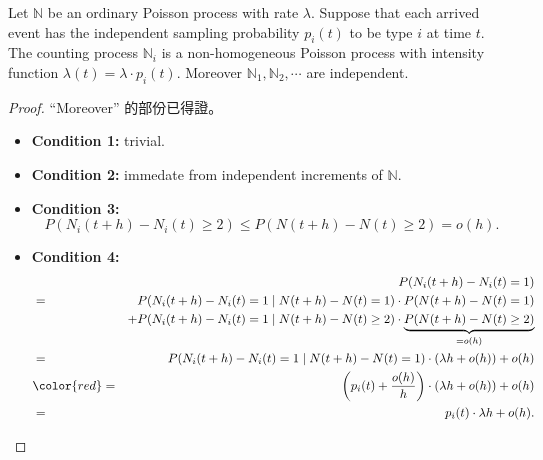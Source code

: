 \begin{proposition} \label{pro:home_to_non-home}
Let $ \mathbb{N} $ be an ordinary Poisson process with rate $ \lambda $. Suppose that each arrived event has the independent sampling probability $ p_{i}(t) $ to be type $ i $ at time $ t $. The counting process $ \mathbb{N}_{i} $ is a non-homogeneous Poisson process with intensity function $ \lambda(t) = \lambda \cdot p_{i}(t) $. Moreover $ \mathbb{N}_{1}, \mathbb{N}_{2}, \cdots $ are independent.
\begin{proof}
``Moreover'' 的部份已得證。
\begin{itemize}
\item \textbf{Condition 1:} trivial.
\item \textbf{Condition 2:} immedate from independent increments of $ \mathbb{N} $.

\item \textbf{Condition 3:}
\[ P(N_{i}(t + h) - N_{i}(t) \ge 2) \le P(N(t + h) - N(t) \ge 2) = o(h). \]

\item \textbf{Condition 4:}
\begin{eqnarray*}
  &   & P(N_{i}(t + h) - N_{i}(t) = 1) \\
  & = & P(N_{i}(t + h) - N_{i}(t) = 1 \mid N(t + h) - N(t) = 1) \cdot P(N(t + h) - N(t) = 1) \\
  &   & + P(N_{i}(t + h) - N_{i}(t) = 1 \mid N(t + h) - N(t) \ge 2) \cdot \underbrace{P(N(t + h) - N(t) \ge 2)}_{= o(h)} \\
  & = & P(N_{i}(t + h) - N_{i}(t) = 1 \mid N(t + h) - N(t) = 1) \cdot (\lambda h + o(h)) + o(h) \\
  & {\color{red} =} & \left( p_{i}(t) + \frac{o(h)}{h} \right) \cdot (\lambda h + o(h)) + o(h) \\
  & = & p_{i}(t) \cdot \lambda h + o(h).
\end{eqnarray*}
\end{itemize}
\end{proof}

\begin{comment}
\begin{eqnarray*}
  && \lim_{h \to 0} P(N_{i}(t + h) - N_{i}(t) = 1 \mid N(t + h) - N(t) = 1) = p_{i}(t) \\
  & \Rightarrow & P(N_{i}(t + h) - N_{i}(t) = 1 \mid N(t + h) - N(t) = 1) = p_{i}(t) + \frac{o(h)}{h}.
\end{eqnarray*}
\end{comment}
\end{proposition}

